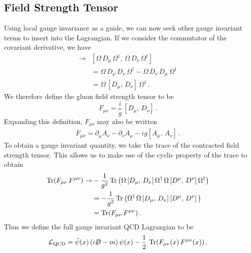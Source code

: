 \subsection{Field Strength Tensor}
Using local gauge invariance as a guide, we can now seek other gauge invariant terms to insert into the Lagrangian. If we consider the commutator of the covariant derivative, we have
%
\begin{align*}
[D_\mu,\, D_\nu]\rightarrow &[\Omega\,D_\mu\,\Omega^\dag,\,\Omega\,D_\nu\,\Omega^\dag]\\
&= \Omega\,D_\mu\, D_\nu\,\Omega^\dag - \Omega\,D_\nu\, D_\mu\,\Omega^\dag\\
&= \Omega\,[D_\mu,\,D_\nu]\,\Omega^\dag\, .
\end{align*}
%
We therefore define the gluon field strength tensor to be
%
\begin{equation}
F_{\mu\nu} = \frac{i}{g}\,[D_\mu,\, D_\nu]\, .
\end{equation}
%
Expanding this definition, $F_{\mu\nu}$ may also be written
%
\begin{align}
F_{\mu\nu}=\partial_\mu A_\nu - \partial_\nu A_\mu - ig[A_\mu,\,A_\nu]\, .
\label{eq:FieldStrengthTensor}
\end{align}
%
To obtain a gauge invariant quantity, we take the trace of the contracted field strength tensor. This allows us to make use of the cyclic property of the trace to obtain
%
\begin{align*}
\operatorname{Tr}(F_{\mu\nu}\,F^{\mu\nu})\rightarrow&-\frac{1}{g^2}\operatorname{Tr}\left(\Omega\,[D_\mu,\,D_\nu]\,\Omega^\dag\,\Omega\,[D^\mu,\,D^\nu]\,\Omega^\dag\right)\\
&=-\frac{1}{g^2}\operatorname{Tr}\left(\Omega^\dag\,\Omega\,[D_\mu,\,D_\nu]\,[D^\mu,\,D^\nu]\,\right)\\
&=\operatorname{Tr}(F_{\mu\nu}\,F^{\mu\nu})\, .
\end{align*}
%
Thus we define the full gauge invariant QCD Lagrangian to be
%
\begin{equation}
\mathcal{L_{\text{QCD}}}=\bar{\psi}(x)\,(i\slashed{D}-m)\,\psi(x)-\frac{1}{2}\,\operatorname{Tr}(F_{\mu\nu}(x)\,F^{\mu\nu}(x))\, .
\label{eq:QCDLagrangian}
\end{equation}\\

